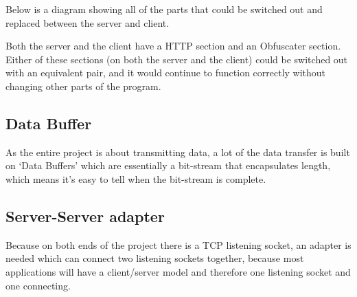 Below is a diagram showing all of the parts that could be switched out and replaced between the server and client.
\begin{center}
\end{center}
Both the server and the client have a HTTP section and an Obfuscater section.
Either of these sections (on both the server and the client) could be switched out with an equivalent pair, and it would continue to function correctly without changing other parts of the program.

\subsection{Data Buffer}
As the entire project is about transmitting data, a lot of the data transfer is built on `Data Buffers' which are essentially a bit-stream that encapsulates length, which means it's easy to tell when the bit-stream is complete.

\subsection{Server-Server adapter}
Because on both ends of the project there is a TCP listening socket, an adapter is needed which can connect two listening sockets together, because most applications will have a client/server model and therefore one listening socket and one connecting.
